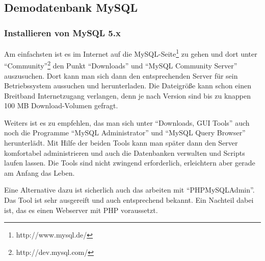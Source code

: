 \subsection{Demodatenbank MySQL}

\subsubsection{Installieren von MySQL 5.x}
Am einfachsten ist es im Internet auf die MySQL-Seite\footnote{http://www.mysql.de/} zu gehen und dort unter "`Community"'\footnote{http://dev.mysql.com/} den Punkt "`Downloads"' und "`MySQL Community Server"' auszusuchen. Dort kann man sich dann den entsprechenden Server für sein Betriebssystem aussuchen und herunterladen. Die Dateigröße kann schon einen Breitband Internetzugang verlangen, denn je nach Version sind bis zu knappen 100 MB Download-Volumen gefragt.

Weiters ist es zu empfehlen, das man sich unter "`Downloads, GUI Tools"' auch noch die Programme "`MySQL Administrator"' und "`MySQL Query Browser"' herunterlädt. Mit Hilfe der beiden Tools kann man später dann den Server komfortabel administrieren und auch die Datenbanken verwalten und Scripts laufen lassen. Die Tools sind nicht zwingend erforderlich, erleichtern aber gerade am Anfang das Leben. 

Eine Alternative dazu ist sicherlich auch das arbeiten mit "`PHPMySQLAdmin"'. Das Tool ist sehr ausgereift und auch entsprechend bekannt. Ein Nachteil dabei ist, das es einen Webserver mit PHP voraussetzt.

